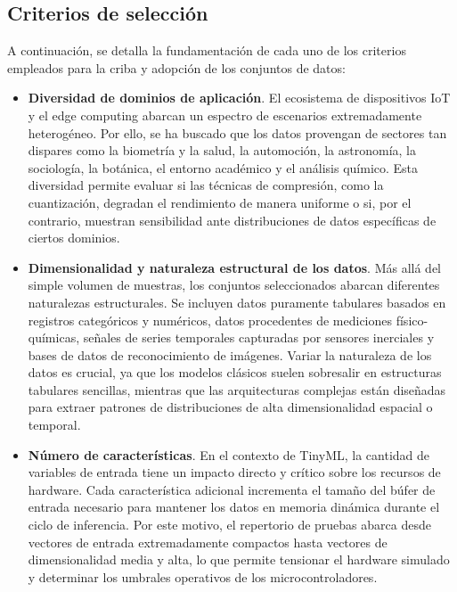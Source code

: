 \documentclass[a4paper,12pt,twoside,final]{book}
\begin{document}
\subsection{Criterios de selección}
A continuación, se detalla la fundamentación de cada uno de los criterios empleados para la criba y adopción de los
conjuntos de datos:
\begin{itemize}
  \item \textbf{Diversidad de dominios de aplicación}. El ecosistema de dispositivos IoT y el edge computing abarcan un
  espectro de escenarios extremadamente heterogéneo. Por ello, se ha buscado que los datos provengan de sectores tan
  dispares como la biometría y la salud, la automoción, la astronomía, la sociología, la botánica, el entorno
  académico y el análisis químico. Esta diversidad permite evaluar si las técnicas de compresión, como la
  cuantización, degradan el rendimiento de manera uniforme o si, por el contrario, muestran sensibilidad ante
  distribuciones de datos específicas de ciertos dominios.
  \item \textbf{Dimensionalidad y naturaleza estructural de los datos}. Más allá del simple volumen de muestras, los
  conjuntos seleccionados abarcan diferentes naturalezas estructurales. Se incluyen datos puramente tabulares basados
  en registros categóricos y numéricos, datos procedentes de mediciones físico-químicas, señales de series temporales
  capturadas por sensores inerciales y bases de datos de reconocimiento de imágenes. Variar la naturaleza de los
  datos es crucial, ya que los modelos clásicos suelen sobresalir en estructuras tabulares sencillas, mientras que
  las arquitecturas complejas están diseñadas para extraer patrones de distribuciones de alta dimensionalidad
  espacial o temporal.
  \item \textbf{Número de características}. En el contexto de TinyML, la cantidad de variables de entrada tiene un
  impacto directo y crítico sobre los recursos de hardware. Cada característica adicional incrementa el tamaño del
  búfer de entrada necesario para mantener los datos en memoria dinámica durante el ciclo de inferencia. Por este
  motivo, el repertorio de pruebas abarca desde vectores de entrada extremadamente compactos hasta vectores de
  dimensionalidad media y alta, lo que permite tensionar el hardware simulado y determinar los umbrales operativos de
  los microcontroladores.
\end{itemize}
\end{document}
